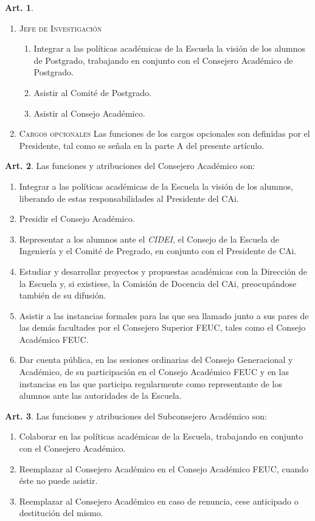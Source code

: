 \documentclass[letterpaper,11pt]{article}
\theoremstyle{definition}%
\newtheorem{art}{Art.} %
\begin{document}
\begin{art}
\begin{enumerate}
		\item \textsc{Jefe de Investigación}
		      \begin{enumerate}
			      \item Integrar a las políticas académicas de la Escuela la visión de los alumnos de Postgrado, trabajando en conjunto con el Consejero Académico de Postgrado.
			      \item Asistir al Comité de Postgrado.
			      \item Asistir al Consejo Académico.
		      \end{enumerate}

		\item \textsc{Cargos opcionales}
		      Las funciones de los cargos opcionales son definidas por el Presidente, tal como se señala en la parte A del presente artículo.
	\end{enumerate}
\end{art}

\begin{art}\label{funcionesCAPregrado}
	Las funciones y atribuciones del Consejero Académico son:
	\begin{enumerate}
		\item Integrar a las políticas académicas de la Escuela la visión de los alumnos, liberando de estas responsabilidades al Presidente del CAi.
		\item Presidir el Consejo Académico.
		\item Representar a los alumnos ante el \emph{CIDEI}, el Consejo de la Escuela de Ingeniería y el Comité de Pregrado, en conjunto con el Presidente de CAi.
		\item Estudiar y desarrollar proyectos y propuestas académicas con la Dirección de la Escuela y, si existiese, la Comisión de Docencia del CAi, preocupándose también de su difusión.
		\item Asistir a las instancias formales para las que sea llamado junto a sus pares de las demás facultades por el Consejero Superior FEUC, tales como el Consejo Académico FEUC\@.
		\item Dar cuenta pública, en las sesiones ordinarias del Consejo Generacional y Académico, de su participación en el Consejo Académico FEUC y en las instancias en las que participa regularmente como representante de los alumnos ante las autoridades de la Escuela.
	\end{enumerate}
\end{art}

\begin{art}
	Las funciones y atribuciones del Subconsejero Académico son:
	\begin{enumerate}
		\item Colaborar en las políticas académicas de la Escuela, trabajando en conjunto con el Consejero Académico.
		\item Reemplazar al Consejero Académico en el Consejo Académico FEUC, cuando éste no puede asistir.
		\item Reemplazar al Consejero Académico en caso de renuncia, cese anticipado o destitución del mismo.
	\end{enumerate}
\end{art}
\end{document}
